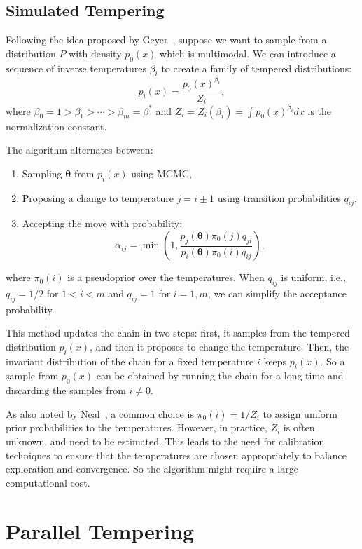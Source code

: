 \documentclass[11pt]{article}
\newcommand{\btheta}{\boldsymbol{\theta}}
\begin{document}
\subsection{Simulated Tempering}

Following the idea proposed by Geyer~\citep{geyer1995annealing}, suppose we want to sample from a 
distribution $P$ with density $p_0(x)$ which is multimodal. We can introduce a sequence of inverse 
temperatures $\beta_i$ to create a family of tempered distributions:
\[
    p_i(x) = \frac{p_0(x)^{\beta_i}}{Z_i},
\]
where $\beta_0 = 1 > \beta_1 > \cdots > \beta_m = \beta^*$ and $Z_i = Z_i(\beta_i) = 
\int p_0(x)^{\beta_i} dx$ is the normalization constant.

The algorithm alternates between:
\begin{enumerate}
    \item Sampling $\btheta$ from $p_i(x)$ using MCMC,
    \item Proposing a change to temperature $j = i \pm 1$ using transition probabilities $q_{ij}$,
    \item Accepting the move with probability:
    \[
        \alpha_{ij} = \min\left(1, \frac{p_j(\btheta)\pi_0(j) q_{ji} }{p_i(\btheta)\pi_0(i) q_{ij} }\right),
    \]
\end{enumerate}
where $\pi_0(i)$ is a pseudoprior over the temperatures. When $q_{ij}$ is
uniform, i.e., $q_{ij} = 1/2$ for $1 < i < m$ and $q_{ij} = 1$ for $i = 1, m$, we can simplify the
acceptance probability.

This method updates the chain in two steps: first, it samples from the tempered distribution
$p_i(x)$, and then it proposes to change the temperature. Then, the invariant distribution of the
chain for a fixed temperature $i$ keeps $p_i(x)$. So a sample from $p_0(x)$ can be obtained by
running the chain for a long time and discarding the samples from $i \neq 0$.

As also noted by Neal~\citep{neal1996sampling}, a common choice is $\pi_0(i) = 1/Z_i$ to assign 
uniform prior probabilities to the temperatures. However, in practice, $Z_i$ is often unknown, and
need to be estimated. This leads to the need for calibration techniques to ensure that the 
temperatures are chosen appropriately to balance exploration and convergence. So the algorithm might
require a large computational cost.

\section{Parallel Tempering}
\end{document}

